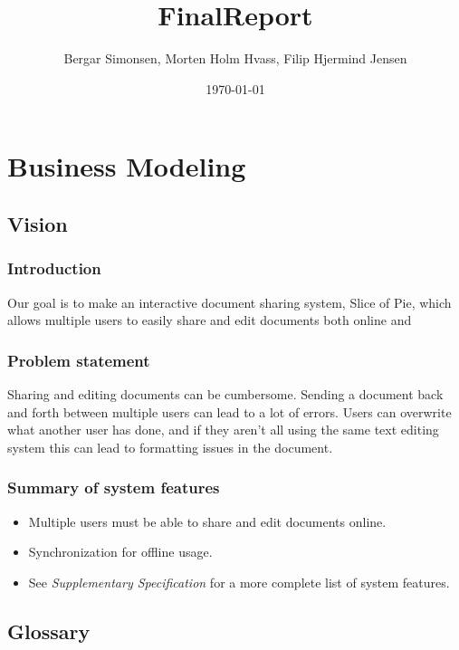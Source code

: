 \documentclass[11pt]{article}
\title{FinalReport}
\author{Bergar Simonsen, Morten Holm Hvass, Filip Hjermind Jensen}
\date{\today}
\begin{document}
\maketitle

\setcounter{tocdepth}{3}
\tableofcontents
\vspace*{1cm}
\section{Business Modeling}
\label{sec-1}
\subsection{Vision}
\label{sec-1-1}
\subsubsection{Introduction}
\label{sec-1-1-1}

    Our goal is to make an interactive document sharing system, Slice of Pie,  which allows multiple users to easily share and edit documents both online and 
\subsubsection{Problem statement}
\label{sec-1-1-2}

    Sharing and editing documents can be cumbersome. 
    Sending a document back and forth between multiple users can lead to a lot of errors. Users can overwrite what another user has done, and if they aren't all
    using the same text editing system this can lead to formatting issues in the document.
\subsubsection{Summary of system features}
\label{sec-1-1-3}

\begin{itemize}
\item Multiple users must be able to share and edit documents online.
\item Synchronization for offline usage.
\item See \emph{Supplementary Specification} for a more complete list of system features.
\end{itemize}
\subsection{Glossary}
\label{sec-1-2}
\end{document}
